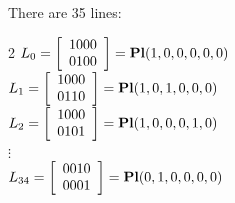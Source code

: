 There are 35 lines:
\begin{multicols}{2}
$L_{0}=\left[
\begin{array}{c}
1000\\
0100\\
\end{array}
\right]
={\rm\bf Pl}(1,0,0,0,0,0 )
$\\
$L_{1}=\left[
\begin{array}{c}
1000\\
0110\\
\end{array}
\right]
={\rm\bf Pl}(1,0,1,0,0,0 )
$\\
$L_{2}=\left[
\begin{array}{c}
1000\\
0101\\
\end{array}
\right]
={\rm\bf Pl}(1,0,0,0,1,0 )
$\\
$\vdots$\\
$L_{34}=\left[
\begin{array}{c}
0010\\
0001\\
\end{array}
\right]
={\rm\bf Pl}(0,1,0,0,0,0 )
$\\
\end{multicols}
